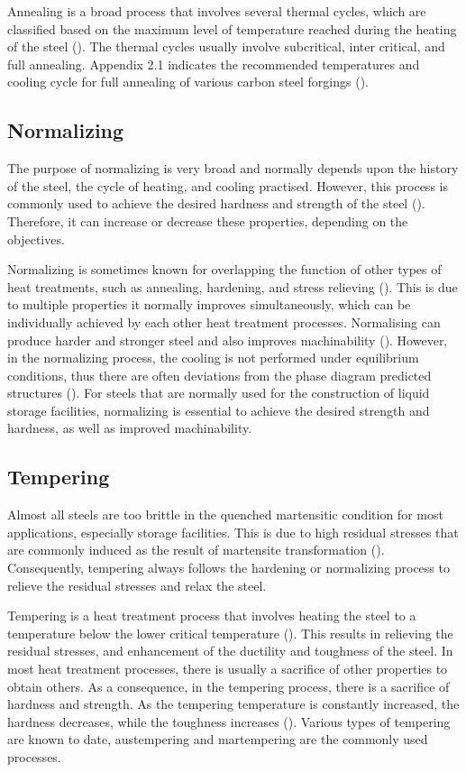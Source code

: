 Annealing is a broad process that involves several thermal cycles, which are classified based on the maximum level of temperature reached during the heating of the steel (\cite{singh2020applied}). The thermal cycles usually involve subcritical, inter critical, and full annealing. Appendix 2.1 indicates the recommended temperatures and cooling cycle for full annealing of various carbon steel forgings (\cite{singh2020applied}).

\subsection{Normalizing}
The purpose of normalizing is very broad and normally depends upon the history of the steel, the cycle of heating, and cooling practised. However, this process is commonly used to achieve the desired hardness and strength of the steel (\cite{singh2020applied}). Therefore, it can increase or decrease these properties, depending on the objectives. 

Normalizing is sometimes known for overlapping the function of other types of heat treatments, such as annealing, hardening, and stress relieving (\cite{singh2020applied}). This is due to multiple properties it normally improves simultaneously, which can be individually achieved by each other heat treatment processes. Normalising can produce harder and stronger steel and also improves machinability (\cite{mampuya2021effect}). However, in the normalizing process, the cooling is not performed under equilibrium conditions, thus there are often deviations from the phase diagram predicted structures (\cite{singh2020applied}).  For steels that are normally used for the construction of liquid storage facilities, normalizing is essential to achieve the desired strength and hardness, as well as improved machinability.

\subsection{Tempering}  
Almost all steels are too brittle in the quenched martensitic condition for most applications, especially storage facilities. This is due to high residual stresses that are commonly induced as the result of martensite transformation (\cite{mampuya2021effect}). Consequently, tempering always follows the hardening or normalizing process to relieve the residual stresses and relax the steel. 

Tempering is a heat treatment process that involves heating the steel to a temperature below the lower critical temperature (\cite{singh2020applied}). This results in relieving the residual stresses, and enhancement of the ductility and toughness of the steel. In most heat treatment processes, there is usually a sacrifice of other properties to obtain others. As a consequence, in the tempering process, there is a sacrifice of hardness and strength. As the tempering temperature is constantly increased, the hardness decreases, while the toughness increases (\cite{singh2020applied}). Various types of tempering are known to date, austempering and martempering are the commonly used processes.

